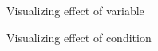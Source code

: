 \documentclass{article}
\begin{document}
\begin{figure}[H]
  \caption{Visualizing effect of variable}
  \noindent{}
  \centering
\end{figure}

\begin{figure}[H]
  \caption{Visualizing effect of condition}
  \noindent{}
  \centering
\end{figure}
\end{document}
